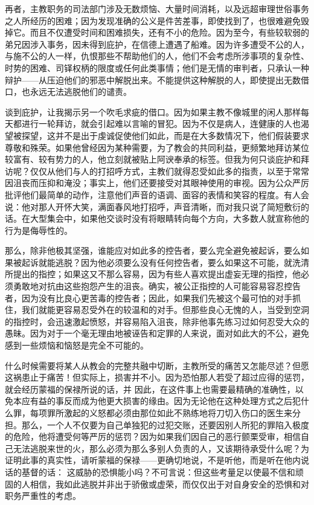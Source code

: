 再者，主教职务的司法部门涉及无数烦恼、大量时间消耗，以及远超审理世俗事务之人所经历的困难；因为发现准确的公义是件苦差事，即使找到了，也很难避免毁掉它。而且不仅遭受时间和困难损失，还有不小的危险。因为至今，有些较软弱的弟兄因涉入事务，因未得到庇护，在信德上遭遇了船难。因为许多遭受不公的人，与施不公的人一样，仇恨那些不帮助他们的人，他们不会考虑所涉事项的复杂性、时势的困难、司铎权柄的限度或任何此类事情；他们是无情的审判者，只承认一种辩护——从压迫他们的邪恶中解脱出来。不能提供这种解脱的人，即使提出无数借口，也永远无法逃脱他们的谴责。\par

谈到庇护，让我揭示另一个吹毛求疵的借口。因为如果主教不像城里的闲人那样每天都进行一轮拜访，就会引起难以言喻的冒犯。因为不仅是病人，连健康的人也渴望被探望，这并不是出于虔诚促使他们如此，而是在大多数情况下，他们假装要求尊敬和殊荣。如果他曾经因为某种需要，为了教会的共同利益，更频繁地拜访某位较富有、较有势力的人，他立刻就被贴上阿谀奉承的标签。但我为何只谈庇护和拜访呢？仅仅从他们与人的打招呼方式，主教们就得忍受如此多的指责，以至于常常因沮丧而压抑和淹没；事实上，他们还要接受对其眼神使用的审视。因为公众严厉批评他们最简单的动作，注意他们声音的语调、面容的表情和笑容的程度。有人会说：他对那人开怀大笑，满面春风地打招呼，声音清晰，而对我只说了简短敷衍的话。在大型集会中，如果他交谈时没有将眼睛转向每个方向，大多数人就宣称他的行为是侮辱性的。\par

那么，除非他极其坚强，谁能应对如此多的控告者，要么完全避免被起诉，要么如果被起诉就能逃脱？因为他必须要么没有任何控告者，要么如果这不可能，就洗清所提出的指控；如果这又不那么容易，因为有些人喜欢提出虚妄无理的指控，他必须勇敢地对抗由这些抱怨产生的沮丧。确实，被公正指控的人可能容易容忍控告者，因为没有比良心更苦毒的控告者；因此，如果我们先被这个最可怕的对手抓住，我们就能更容易忍受外在的较温和的对手。但那些良心无愧的人，当受到空洞的指控时，会迅速激起愤怒，并容易陷入沮丧，除非他事先练习过如何忍受大众的愚昧。因为对于一个毫无理由地被诬告和定罪的人来说，面对如此大的不公，避免感到一些烦恼和恼怒是完全不可能的。\par

什么时候需要将某人从教会的完整共融中切断，主教所受的痛苦又怎能尽述？但愿这祸患止于痛苦！但实际上，损害并不小。因为恐怕那人若受了超过应得的惩罚，就会经历蒙福的保禄所说的话，并  因此，在这件事上也需要最精确的准确性，以免本应有益的事反而成为他更大损害的缘由。因为无论他在这种处理方式之后犯什么罪，每项罪所激起的义怒都必须由那位如此不熟练地将刀切入伤口的医生来分担。那么，一个人不仅要为自己单独犯的过犯交账，还要因别人所犯的罪陷入极度的危险，他将遭受何等严厉的惩罚？因为如果我们因自己的恶行颤栗受审，相信自己无法逃脱来世的火，那么必须为那么多别人负责的人，又该期待承受什么呢？为证明此事的真实性，请听蒙福的保禄——更确切地说，不是听他，而是听在他内说话的基督的话：  这威胁的恐惧能小吗？不可言说：但这些考量足以使最不信和顽固的人相信，我如此逃脱并非出于骄傲或虚荣，而仅仅出于对自身安全的恐惧和对职务严重性的考虑。\par


